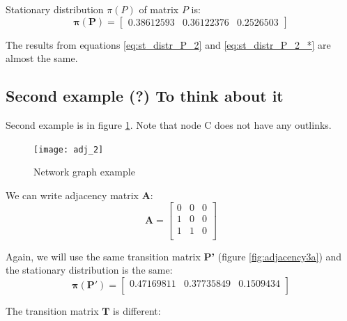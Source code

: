 \documentclass{article}
\begin{document}
Stationary distribution $\pi(P)$ of matrix $P$ is:
\begin{equation}
\mathbf{\pi(P)} = 
\begin{bmatrix}
0.38612593 &  0.36122376 & 0.2526503
\end{bmatrix}
\label{eq:st_distr_P_2}
\end{equation}

The results from equations \ref{eq:st_distr_P_2} and \ref{eq:st_distr_P_2_*} are almost the same.

\subsection{Second example (?) To think about it}
Second example is in figure  \ref{fig:adj_2}. Note that node C does not have any outlinks. 
\begin{figure}
\centering
\texttt{[image: adj\_2]}
\caption{Network graph example}
\label{fig:adj_2}
\end{figure}

We can write adjacency matrix \textbf{A}:
\[\mathbf{A} = 
\begin{bmatrix}
0  & 0  & 0 \\
1 & 0 & 0 \\
1 & 1 & 0\\
\end{bmatrix}
\]

Again, we will use the same transition matrix \textbf{P'} (figure \ref{fig:adjacency3a}) and the stationary distribution is the same: 
\[\mathbf{\pi(P')} = \begin{bmatrix}
	0.47169811 &  0.37735849 & 0.1509434\\
	\end{bmatrix}
\]

The transition matrix $\mathbf{T}$ is different:
\end{document}
